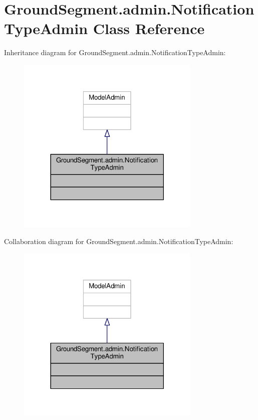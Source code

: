 \hypertarget{class_ground_segment_1_1admin_1_1_notification_type_admin}{}\section{Ground\+Segment.\+admin.\+Notification\+Type\+Admin Class Reference}
\label{class_ground_segment_1_1admin_1_1_notification_type_admin}


Inheritance diagram for Ground\+Segment.\+admin.\+Notification\+Type\+Admin\+:\nopagebreak
\begin{figure}[H]
\begin{center}
\leavevmode
\includegraphics[width=249pt]{class_ground_segment_1_1admin_1_1_notification_type_admin__inherit__graph}
\end{center}
\end{figure}


Collaboration diagram for Ground\+Segment.\+admin.\+Notification\+Type\+Admin\+:\nopagebreak
\begin{figure}[H]
\begin{center}
\leavevmode
\includegraphics[width=249pt]{class_ground_segment_1_1admin_1_1_notification_type_admin__coll__graph}
\end{center}
\end{figure}


